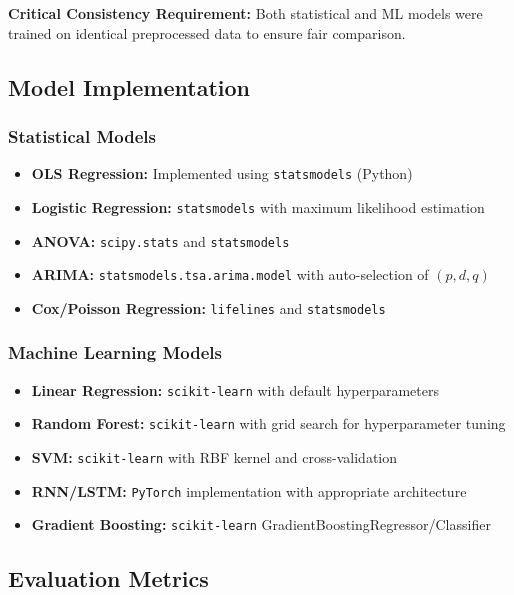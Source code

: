 \documentclass[11pt,a4paper]{article}
\begin{document}
\textbf{Critical Consistency Requirement:} Both statistical and ML models were trained on identical preprocessed data to ensure fair comparison.

\subsection{Model Implementation}

\subsubsection{Statistical Models}

\begin{itemize}
    \item \textbf{OLS Regression:} Implemented using \texttt{statsmodels} (Python)
    \item \textbf{Logistic Regression:} \texttt{statsmodels} with maximum likelihood estimation
    \item \textbf{ANOVA:} \texttt{scipy.stats} and \texttt{statsmodels}
    \item \textbf{ARIMA:} \texttt{statsmodels.tsa.arima.model} with auto-selection of $(p,d,q)$
    \item \textbf{Cox/Poisson Regression:} \texttt{lifelines} and \texttt{statsmodels}
\end{itemize}

\subsubsection{Machine Learning Models}

\begin{itemize}
    \item \textbf{Linear Regression:} \texttt{scikit-learn} with default hyperparameters
    \item \textbf{Random Forest:} \texttt{scikit-learn} with grid search for hyperparameter tuning
    \item \textbf{SVM:} \texttt{scikit-learn} with RBF kernel and cross-validation
    \item \textbf{RNN/LSTM:} \texttt{PyTorch} implementation with appropriate architecture
    \item \textbf{Gradient Boosting:} \texttt{scikit-learn} GradientBoostingRegressor/Classifier
\end{itemize}

\subsection{Evaluation Metrics}
\end{document}
